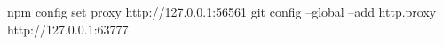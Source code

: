npm config set proxy http://127.0.0.1:56561
git config --global --add http.proxy http://127.0.0.1:63777